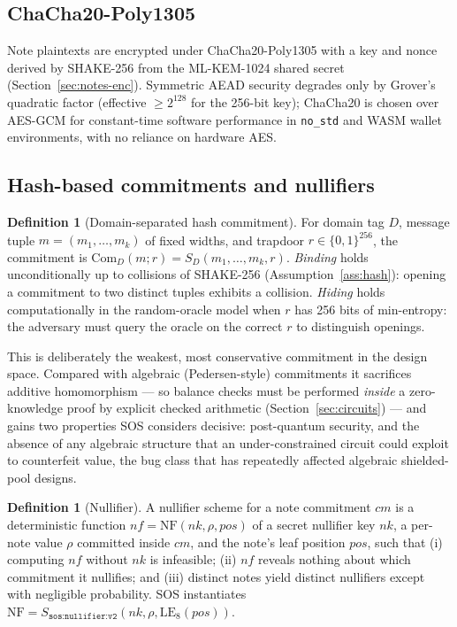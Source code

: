 \documentclass[11pt]{article}
\newcommand{\code}[1]{\texttt{#1}}
\newcommand{\mlkem}{ML\mbox{-}KEM\mbox{-}1024}
\newcommand{\shake}{SHAKE\mbox{-}256}
\newcommand{\LE}[1]{\mathrm{LE}_{#1}}
\theoremstyle{plain}
\theoremstyle{definition}
\newtheorem{definition}[theorem]{Definition}
\theoremstyle{remark}
\begin{document}
\subsection{ChaCha20-Poly1305}
\label{sec:aead}

Note plaintexts are encrypted under ChaCha20-Poly1305 \cite{rfc8439} with a key
and nonce derived by \shake{} from the \mlkem{} shared secret
(Section~\ref{sec:notes-enc}). Symmetric AEAD security degrades only by
Grover's quadratic factor (effective $\ge 2^{128}$ for the 256-bit key);
ChaCha20 is chosen over AES-GCM for constant-time software performance in
\code{no\_std} and WASM wallet environments, with no reliance on hardware AES.

\subsection{Hash-based commitments and nullifiers}
\label{sec:commitments}

\begin{definition}[Domain-separated hash commitment]
\label{def:commit}
For domain tag $D$, message tuple $m = (m_1,\dots,m_k)$ of fixed widths, and
trapdoor $r \in \{0,1\}^{256}$, the commitment is
$\mathrm{Com}_D(m; r) = S_D(m_1,\dots,m_k,r)$.
\emph{Binding} holds unconditionally up to collisions of \shake{}
(Assumption~\ref{ass:hash}): opening a commitment to two distinct tuples
exhibits a collision. \emph{Hiding} holds computationally in the random-oracle
model when $r$ has 256 bits of min-entropy: the adversary must query the
oracle on the correct $r$ to distinguish openings.
\end{definition}

This is deliberately the weakest, most conservative commitment in the design
space. Compared with algebraic (Pedersen-style) commitments it sacrifices
additive homomorphism --- so balance checks must be performed \emph{inside}
a zero-knowledge proof by explicit checked arithmetic
(Section~\ref{sec:circuits}) --- and gains two properties SOS considers
decisive: post-quantum security, and the absence of any algebraic structure
that an under-constrained circuit could exploit to counterfeit value, the bug
class that has repeatedly affected algebraic shielded-pool designs.

\begin{definition}[Nullifier]
\label{def:nullifier}
A nullifier scheme for a note commitment $cm$ is a deterministic function
$\mathit{nf} = \mathrm{NF}(\mathit{nk}, \rho, \mathit{pos})$ of a secret
nullifier key $\mathit{nk}$, a per-note value $\rho$ committed inside $cm$,
and the note's leaf position $\mathit{pos}$, such that (i) computing
$\mathit{nf}$ without $\mathit{nk}$ is infeasible; (ii) $\mathit{nf}$ reveals
nothing about which commitment it nullifies; and (iii) distinct notes yield
distinct nullifiers except with negligible probability. SOS instantiates
$\mathrm{NF} = S_{\code{sos:nullifier:v2}}(\mathit{nk}, \rho, \LE{8}(\mathit{pos}))$.
\end{definition}
\end{document}
